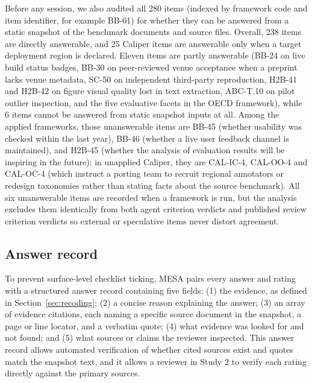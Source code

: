 \documentclass[10pt,conference]{IEEEtran}
\begin{document}
Before any session, we also audited all 280 items (indexed by framework code and item identifier, for example BB-01) for whether they can be answered from a static snapshot of the benchmark documents and source files. Overall, 238 items are directly answerable, and 25 Caliper items are answerable only when a target deployment region is declared. Eleven items are partly answerable (BB-24 on live build status badges, BB-30 on peer-reviewed venue acceptance when a preprint lacks venue metadata, SC-50 on independent third-party reproduction, H2B-41 and H2B-42 on figure visual quality lost in text extraction, ABC-T.10 on pilot outlier inspection, and the five evaluative facets in the OECD framework), while 6 items cannot be answered from static snapshot inputs at all. Among the applied frameworks, those unanswerable items are BB-45 (whether usability was checked within the last year), BB-46 (whether a live user feedback channel is maintained), and H2B-45 (whether the analysis of evaluation results will be inspiring in the future); in unapplied Caliper, they are CAL-IC-4, CAL-OO-4 and CAL-OC-4 (which instruct a porting team to recruit regional annotators or redesign taxonomies rather than stating facts about the source benchmark). All six unanswerable items are recorded when a framework is run, but the analysis excludes them identically from both agent criterion verdicts and published review criterion verdicts so external or speculative items never distort agreement.

\subsection{Answer record}
\label{sec:evidence-record}
To prevent surface-level checklist ticking, MESA pairs every answer and rating with a structured answer record containing five fields: (1) the evidence, as defined in Section~\ref{sec:recoding}; (2) a concise reason explaining the answer; (3) an array of evidence citations, each naming a specific source document in the snapshot, a page or line locator, and a verbatim quote; (4) what evidence was looked for and not found; and (5) what sources or claims the reviewer inspected. This answer record allows automated verification of whether cited sources exist and quotes match the snapshot text, and it allows a reviewer in Study 2 to verify each rating directly against the primary sources.
\end{document}
